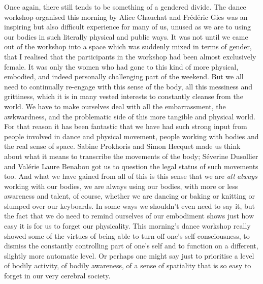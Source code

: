 {Once again, there still tends to be something of a gendered divide. The
dance workshop organised this morning by Alice Chauchat and
Fr\'ed\'eric Gies was an inspiring but also difficult experience for
many of us, unused as we are to using our bodies in such literally
physical and public ways. It was not until we came out of the workshop
into a space which was suddenly mixed in terms of gender, that I
realised that the participants in the workshop had been almost
exclusively female. It was only the women who had gone to this kind of
more physical, embodied, and indeed personally challenging part of the
weekend. But we all need to continually re{}-engage with this sense of
the body, all this messiness and grittiness, which it is in many vested
interests to constantly cleanse from the world. We have to make
ourselves deal with all the embarrassment, the awkwardness, and the
problematic side of this more tangible and physical world. For that
reason it has been fantastic that we have had such strong input from
people involved in dance and physical movement, people working with
bodies and the real sense of space. Sabine Prokhoris and Simon Hecquet
made us think about what it means to transcribe the movements of the
body; S\'everine Dusollier and Val\'erie Laure Benabou got us to
question the legal status of such movements too. And what we have
gained from all of this is this sense that we are {\em all always}
working with our bodies, we are always using our bodies, with more or
less awareness and talent, of course, whether we are dancing or baking
or knitting or slumped over our keyboards. In some ways we shouldn't
even need to say it, but the fact that we do need to remind ourselves
of our embodiment shows just how easy it is for us to forget our
physicality. This morning's dance workshop really showed some of the
virtues of being able to turn off one's self{}-consciousness, to
dismiss the constantly controlling part of one's self and to function
on a different, slightly more automatic level. Or perhaps one might say
just to prioritise a level of bodily activity, of bodily awareness, of
a sense of spatiality that is so easy to forget in our very cerebral
society. 

}
